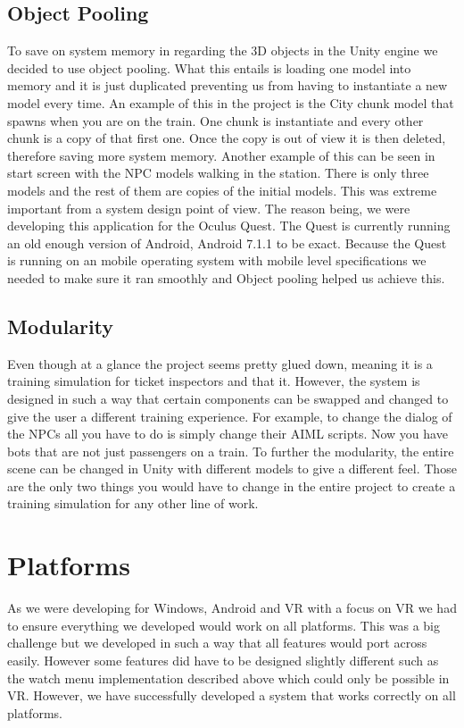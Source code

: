 \subsection{Object Pooling}
To save on system memory in regarding the 3D objects in the Unity engine we decided to use object pooling. What this entails is loading one model into memory and it is just duplicated preventing us from having to instantiate a new model every time. An example of this in the project is the City chunk model that spawns when you are on the train. One chunk is instantiate and every other chunk is a copy of that first one. Once the copy is out of view it is then deleted, therefore saving more system memory. Another example of this can be seen in start screen with the NPC models walking in the station. There is only three models and the rest of them are copies of the initial models. This was extreme important from a system design point of view. The reason being, we were developing this application for the Oculus Quest. The Quest is currently running an old enough version of Android, Android 7.1.1 to be exact. Because the Quest is running on an mobile operating system with mobile level specifications we needed to make sure it ran smoothly and Object pooling helped us achieve this.

\subsection{Modularity}
Even though at a glance the project seems pretty glued down, meaning it is a training simulation for ticket inspectors and that it. However, the system is designed in such a way that certain components can be swapped and changed to give the user a different training experience. For example, to change the dialog of the NPCs all you have to do is simply change their AIML scripts. Now you have bots that are not just passengers on a train. To further the modularity, the entire scene can be changed in Unity with different models to give a different feel. Those are the only two things you would have to change in the entire project to create a training simulation for any other line of work.

\section{Platforms}
As we were developing for Windows, Android and VR with a focus on VR we had to ensure everything we developed would work on all platforms. This was a big challenge but we developed in such a way that all features would port across easily. However some features did have to be designed slightly different such as the watch menu implementation described above which could only be possible in VR. However, we have successfully developed a system that works correctly on all platforms.